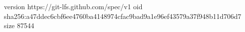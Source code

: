 version https://git-lfs.github.com/spec/v1
oid sha256:a47ddec6cbf6ee4760ba4148974cfac9bad9a1e96ef43579a37f948b11d706d7
size 87544
